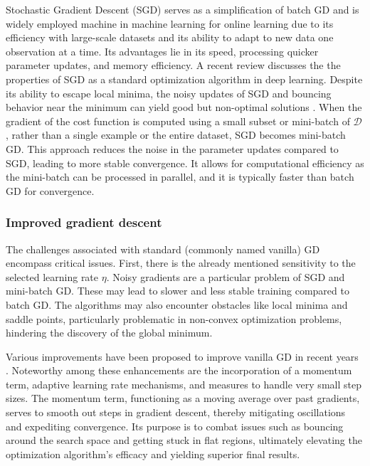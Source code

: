 Stochastic Gradient Descent (SGD) \cite{Bottou2012Stochasticgradientdescent} serves as a simplification of batch GD and is widely employed machine in machine learning for online learning due to its efficiency with large-scale datasets and its ability to adapt to new data one observation at a time. Its advantages lie in its speed, processing quicker parameter updates, and memory efficiency. A recent review \cite{Tian2023RecentAdvancesStochastic} discusses the the properties of SGD as a standard optimization algorithm in deep learning. Despite its ability to escape local minima, the noisy updates of SGD and bouncing behavior near the minimum can yield good but non-optimal solutions . When the gradient of the cost function is computed using a small subset or mini-batch of $\mathcal{D}$, rather than a single example or the entire dataset, SGD becomes mini-batch GD. This approach reduces the noise in the parameter updates compared to SGD, leading to more stable convergence. It allows for computational efficiency as the mini-batch can be processed in parallel, and it is typically faster than batch GD for convergence.

\subsubsection{Improved gradient descent}
The challenges associated with standard (commonly named vanilla) GD encompass critical issues. First, there is the already mentioned sensitivity to the selected learning rate $\eta$. Noisy gradients are a particular problem of SGD and mini-batch GD. These may lead to slower and less stable training compared to batch GD. The algorithms may also encounter obstacles like local minima and saddle points, particularly problematic in non-convex optimization problems, hindering the discovery of the global minimum.

Various improvements have been proposed to improve vanilla GD in recent years \cite{Ruder2016overviewgradientdescent,Tian2023RecentAdvancesStochastic}. Noteworthy among these enhancements are the incorporation of a momentum term, adaptive learning rate mechanisms, and measures to handle very small step sizes. The momentum term, functioning as a moving average over past gradients, serves to smooth out steps in gradient descent, thereby mitigating oscillations and expediting convergence. Its purpose is to combat issues such as bouncing around the search space and getting stuck in flat regions, ultimately elevating the optimization algorithm's efficacy and yielding superior final results.

